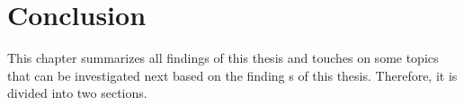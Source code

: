 \chapter{Conclusion}

This chapter summarizes all findings of this thesis and touches on some topics that can be investigated next based on the finding s of this thesis.
Therefore, it is divided into two sections.



